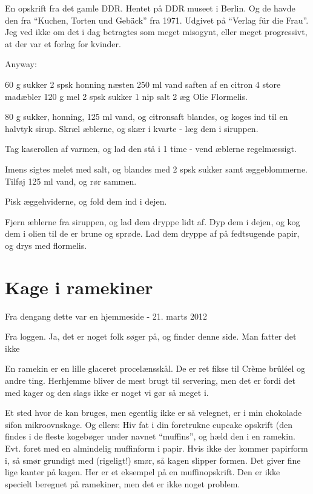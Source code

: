 \documentclass[
]{book}
\begin{document}
En opskrift fra det gamle DDR. Hentet på DDR museet i Berlin. Og de havde den fra ``Kuchen, Torten und Gebäck'' fra 1971. Udgivet på ``Verlag für die Frau''. Jeg ved ikke om det i dag betragtes som meget misogynt, eller meget progressivt, at der var et forlag for kvinder.

Anyway:

60 g sukker
2 spsk honning
næsten 250 ml vand
saften af en citron
4 store madæbler
120 g mel
2 spsk sukker
1 nip salt
2 æg
Olie
Flormelis.

80 g sukker, honning, 125 ml vand, og citronsaft blandes, og koges ind til en halvtyk sirup. Skræl æblerne, og skær i kvarte - læg dem i siruppen.

Tag kaserollen af varmen, og lad den stå i 1 time - vend æblerne regelmæssigt.

Imens sigtes melet med salt, og blandes med 2 spsk sukker samt æggeblommerne. Tilføj 125 ml vand, og rør sammen.

Pisk æggehviderne, og fold dem ind i dejen.

Fjern æblerne fra siruppen, og lad dem dryppe lidt af. Dyp dem i dejen, og kog dem i olien til de er brune og sprøde. Lad dem dryppe af på fedtsugende papir, og drys med flormelis.

\hypertarget{kage-i-ramekiner}{%
\section{Kage i ramekiner}\label{kage-i-ramekiner}}

Fra dengang dette var en hjemmeside - 21. marts 2012

Fra loggen. Ja, det er noget folk søger på, og finder denne side. Man fatter det ikke

En ramekin er en lille glaceret procelænsskål. De er ret fikse til Crème brûléel og andre ting. Herhjemme bliver de mest brugt til servering, men det er fordi det med kager og den slags ikke er noget vi gør så meget i.~

Et sted hvor de kan bruges, men egentlig ikke er så velegnet, er i min chokolade sifon mikroovnskage. Og ellers: Hiv fat i din foretrukne cupcake opskrift (den findes i de fleste kogebøger under navnet ``muffins'', og hæld den i en ramekin. Evt. foret med en almindelig muffinform i papir. Hvis ikke der kommer papirform i, så smør grundigt med (rigeligt!) smør, så kagen slipper formen. Det giver fine lige kanter på kagen. Her er et eksempel på en muffinopskrift. Den er ikke specielt beregnet på ramekiner, men det er ikke noget problem.
\end{document}
